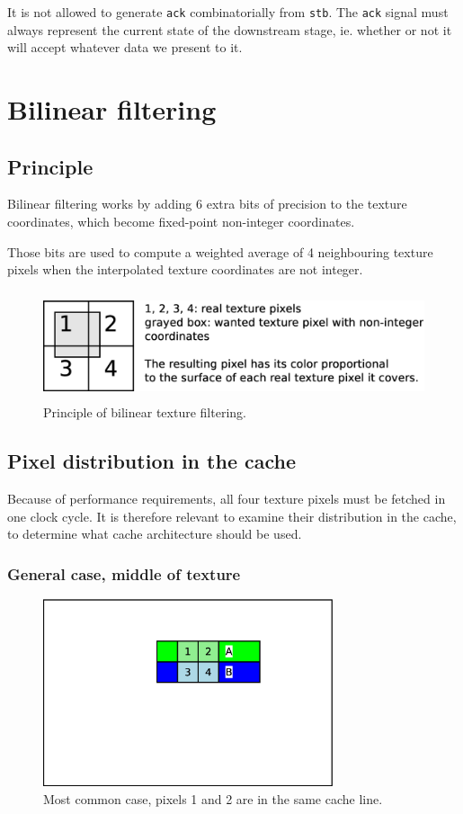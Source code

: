 \documentclass[a4paper,11pt]{article}
\begin{document}
It is not allowed to generate \verb!ack! combinatorially from \verb!stb!. The \verb!ack! signal must always represent the current state of the downstream stage, ie. whether or not it will accept whatever data we present to it.

\section{Bilinear filtering}
\subsection{Principle}
Bilinear filtering works by adding 6 extra bits of precision to the texture coordinates, which become fixed-point non-integer coordinates.

Those bits are used to compute a weighted average of 4 neighbouring texture pixels when the interpolated texture coordinates are not integer.

\begin{figure}[H]
\centering
\includegraphics[height=32mm]{bilinear.eps}
\caption{Principle of bilinear texture filtering.}\label{fig:bilinear}
\end{figure}

\subsection{Pixel distribution in the cache}
Because of performance requirements, all four texture pixels must be fetched in one clock cycle. It is therefore relevant to examine their distribution in the cache, to determine what cache architecture should be used.

\subsubsection{General case, middle of texture}
\begin{figure}[H]
\centering
\includegraphics[height=55mm]{dist_common.eps}
\caption{Most common case, pixels 1 and 2 are in the same cache line.}\label{fig:case1}
\end{figure}
\end{document}
